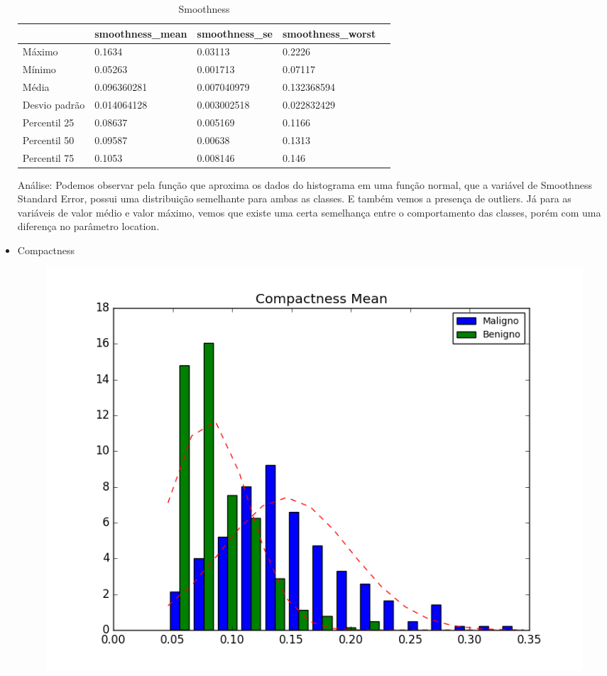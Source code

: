 \documentclass[11pt,a4paper]{article}
\numberwithin{equation}{section}
\begin{document}
\begin{itemize}
\begin{table}[H]
\centering
\caption{Smoothness}
\label{my-label}
\begin{tabular}{lllll} \hline
              & smoothness\_mean & smoothness\_se & smoothness\_worst &  \\ \hline
Máximo        & 0.1634           & 0.03113        & 0.2226            &  \\
Mínimo        & 0.05263          & 0.001713       & 0.07117           &  \\
Média         & 0.096360281      & 0.007040979    & 0.132368594       &  \\
Desvio padrão & 0.014064128      & 0.003002518    & 0.022832429       &  \\
Percentil 25  & 0.08637          & 0.005169       & 0.1166            &  \\
Percentil 50  & 0.09587          & 0.00638        & 0.1313            &  \\
Percentil 75  & 0.1053           & 0.008146       & 0.146             & \\ \hline
\end{tabular}
\end{table}

Análise: Podemos observar pela função que aproxima os dados do histograma em uma função normal, que a variável de Smoothness Standard Error, possui uma distribuição semelhante para ambas as classes.  E também vemos a presença de outliers. Já para as variáveis de valor médio e valor máximo, vemos que existe uma certa semelhança entre o comportamento das classes, porém com uma diferença no parâmetro location.

\item Compactness
\begin{figure}[H]
\centering
  \includegraphics[width=.5\linewidth]{../img/hist/compactness_mean}
  \label{fig:test1}
\end{figure}%



\end{itemize}
\end{document}
